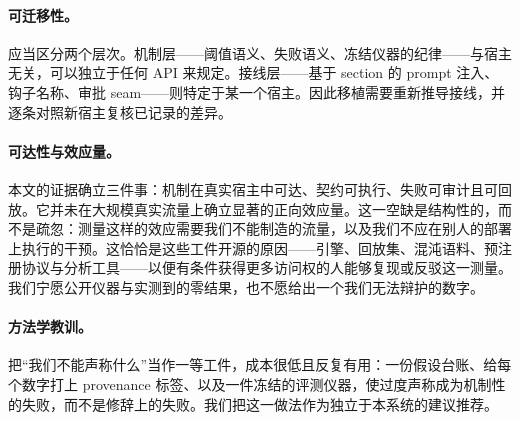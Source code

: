 \paragraph{可迁移性。} 应当区分两个层次。机制层——阈值语义、失败语义、冻结仪器的纪律——与宿主无关，可以独立于任何 API 来规定。接线层——基于 section 的 prompt 注入、钩子名称、审批 seam——则特定于某一个宿主。因此移植需要重新推导接线，并逐条对照新宿主复核已记录的差异。

\paragraph{可达性与效应量。} 本文的证据确立三件事：机制在真实宿主中可达、契约可执行、失败可审计且可回放。它并未在大规模真实流量上确立显著的正向效应量。这一空缺是结构性的，而不是疏忽：测量这样的效应需要我们不能制造的流量，以及我们不应在别人的部署上执行的干预。这恰恰是这些工件开源的原因——引擎、回放集、混沌语料、预注册协议与分析工具——以便有条件获得更多访问权的人能够复现或反驳这一测量。我们宁愿公开仪器与实测到的零结果，也不愿给出一个我们无法辩护的数字。

\paragraph{方法学教训。} 把“我们不能声称什么”当作一等工件，成本很低且反复有用：一份假设台账、给每个数字打上 provenance 标签、以及一件冻结的评测仪器，使过度声称成为机制性的失败，而不是修辞上的失败。我们把这一做法作为独立于本系统的建议推荐。

